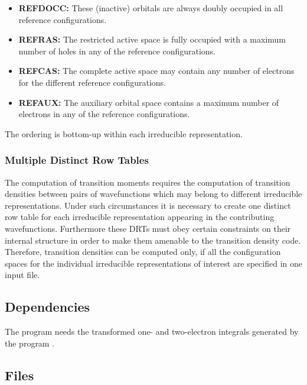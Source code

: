 \begin{itemize}
\itemsep 9pt plus 3pt minus 3pt
\item
{\bf REFDOCC:}
These (inactive) orbitals are always doubly occupied in all reference configurations. 
\item
{\bf REFRAS:}
The restricted active space  
is fully occupied  with a maximum number of holes in any of the reference configurations.  
\item
{\bf REFCAS:}
The complete active space may contain any number of electrons  
for the different reference configurations.
\item
{\bf REFAUX:}
The auxiliary orbital space contains a maximum number of electrons in any
of the reference configurations.
\end{itemize}

The ordering is bottom-up within each irreducible representation.


\subsubsection{Multiple Distinct Row Tables}
The computation of transition moments requires the computation of
transition densities between pairs of wavefunctions which may belong
to different irreducible representations. Under such circumstances
it is necessary to create one distinct row table for each irreducible representation
appearing in the contributing wavefunctions. Furthermore these DRTs must 
obey certain constraints on their internal structure in order to 
make them amenable to the transition density code. Therefore, transition
densities can be computed only, if all the configuration spaces for 
the individual irreducible representations of interest are specified
in one input file.

\subsection{Dependencies}
\label{UG:sec:columbus_dependencies}
The program needs 
the transformed one- and two-electron integrals
generated by the program
.

\subsection{Files}
\label{UG:sec:columbus_files}
